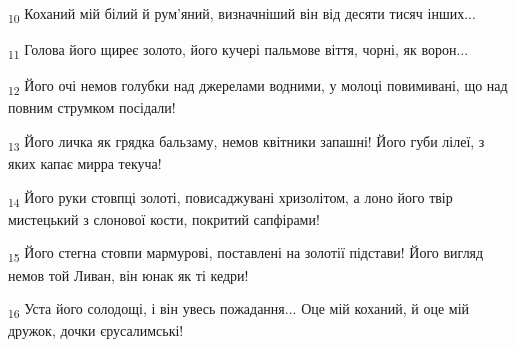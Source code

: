 \begin{tcolorbox}
\textsubscript{10} Коханий мій білий й рум'яний, визначніший він від десяти тисяч інших...
\end{tcolorbox}
\begin{tcolorbox}
\textsubscript{11} Голова його щиреє золото, його кучері пальмове віття, чорні, як ворон...
\end{tcolorbox}
\begin{tcolorbox}
\textsubscript{12} Його очі немов голубки над джерелами водними, у молоці повимивані, що над повним струмком посідали!
\end{tcolorbox}
\begin{tcolorbox}
\textsubscript{13} Його личка як грядка бальзаму, немов квітники запашні! Його губи лілеї, з яких капає мирра текуча!
\end{tcolorbox}
\begin{tcolorbox}
\textsubscript{14} Його руки стовпці золоті, повисаджувані хризолітом, а лоно його твір мистецький з слонової кости, покритий сапфірами!
\end{tcolorbox}
\begin{tcolorbox}
\textsubscript{15} Його стегна стовпи мармурові, поставлені на золотії підстави! Його вигляд немов той Ливан, він юнак як ті кедри!
\end{tcolorbox}
\begin{tcolorbox}
\textsubscript{16} Уста його солодощі, і він увесь пожадання... Оце мій коханий, й оце мій дружок, дочки єрусалимські!
\end{tcolorbox}
